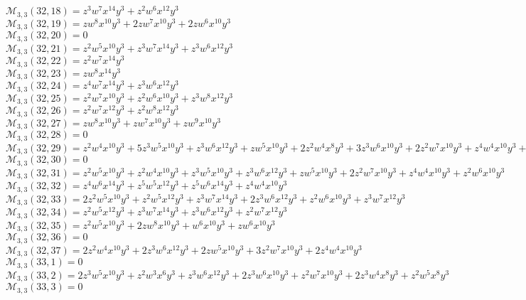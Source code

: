 \documentclass[12pt]{memoireuqam1.3}
\begin{document}
$\mathcal{M}_{3,3}(32,18)=z^3w^7x^{14}y^3+z^2w^6x^{12}y^3$\\
$\mathcal{M}_{3,3}(32,19)=zw^8x^{10}y^3+2zw^7x^{10}y^3+2zw^6x^{10}y^3$\\
$\mathcal{M}_{3,3}(32,20)=0$\\
$\mathcal{M}_{3,3}(32,21)=z^2w^5x^{10}y^3+z^3w^7x^{14}y^3+z^3w^6x^{12}y^3$\\
$\mathcal{M}_{3,3}(32,22)=z^2w^7x^{14}y^3$\\
$\mathcal{M}_{3,3}(32,23)=zw^8x^{14}y^3$\\
$\mathcal{M}_{3,3}(32,24)=z^4w^7x^{14}y^3+z^3w^6x^{12}y^3$\\
$\mathcal{M}_{3,3}(32,25)=z^2w^7x^{10}y^3+z^2w^6x^{10}y^3+z^3w^8x^{12}y^3$\\
$\mathcal{M}_{3,3}(32,26)=z^2w^7x^{12}y^3+z^2w^8x^{12}y^3$\\
$\mathcal{M}_{3,3}(32,27)=zw^8x^{10}y^3+zw^7x^{10}y^3+zw^9x^{10}y^3$\\
$\mathcal{M}_{3,3}(32,28)=0$\\
$\mathcal{M}_{3,3}(32,29)=z^2w^4x^{10}y^3+5z^3w^5x^{10}y^3+z^3w^6x^{12}y^3+zw^5x^{10}y^3+2z^2w^4x^8y^3+3z^3w^6x^{10}y^3+2z^2w^7x^{10}y^3+z^4w^4x^{10}y^3+z^2w^5x^8y^3$\\
$\mathcal{M}_{3,3}(32,30)=0$\\
$\mathcal{M}_{3,3}(32,31)=z^2w^5x^{10}y^3+z^2w^4x^{10}y^3+z^3w^5x^{10}y^3+z^3w^6x^{12}y^3+zw^5x^{10}y^3+2z^2w^7x^{10}y^3+z^4w^4x^{10}y^3+z^2w^6x^{10}y^3$\\
$\mathcal{M}_{3,3}(32,32)=z^4w^6x^{14}y^3+z^5w^5x^{12}y^3+z^5w^6x^{14}y^3+z^4w^4x^{10}y^3$\\
$\mathcal{M}_{3,3}(32,33)=2z^2w^5x^{10}y^3+z^2w^5x^{12}y^3+z^3w^7x^{14}y^3+2z^3w^6x^{12}y^3+z^2w^6x^{10}y^3+z^3w^7x^{12}y^3$\\
$\mathcal{M}_{3,3}(32,34)=z^2w^5x^{12}y^3+z^3w^7x^{14}y^3+z^3w^6x^{12}y^3+z^2w^7x^{12}y^3$\\
$\mathcal{M}_{3,3}(32,35)=z^2w^5x^{10}y^3+2zw^8x^{10}y^3+w^6x^{10}y^3+zw^6x^{10}y^3$\\
$\mathcal{M}_{3,3}(32,36)=0$\\
$\mathcal{M}_{3,3}(32,37)=2z^2w^4x^{10}y^3+2z^3w^6x^{12}y^3+2zw^5x^{10}y^3+3z^2w^7x^{10}y^3+2z^4w^4x^{10}y^3$\\
$\mathcal{M}_{3,3}(33,1)=0$\\
$\mathcal{M}_{3,3}(33,2)=2z^3w^5x^{10}y^3+z^2w^3x^6y^3+z^3w^6x^{12}y^3+2z^3w^6x^{10}y^3+z^2w^7x^{10}y^3+2z^3w^4x^8y^3+z^2w^5x^8y^3$\\
$\mathcal{M}_{3,3}(33,3)=0$\\
\end{document}
